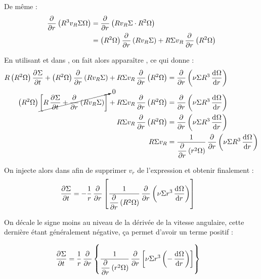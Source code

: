 De même : 
\begin{align}
\dpd{}{r}\left(R^3 v_R \Sigma \Omega\right) &= \dpd{}{r}\left(R v_R \Sigma \cdot R^2\Omega\right)\nonumber\\
&= \left(R^2\Omega\right)\dpd{}{r}\left(R v_R \Sigma\right) + R \Sigma v_R \dpd{}{r}\left(R^2\Omega\right)\label{eq:ang_mom_tmp_02}
\end{align}

En utilisant  et  dans , on fait alors apparaître , ce qui donne : 
\begin{align}
R\left(R^2\Omega\right)\dpd{\Sigma}{t} + \left(R^2\Omega\right)\dpd{}{r}\left(R v_R \Sigma\right) + R \Sigma v_R \dpd{}{r}\left(R^2\Omega\right) &= \dpd{}{r}\left(\nu \Sigma R^3 \dod{\Omega}{r}\right)\nonumber\\
\left(R^2\Omega\right)\cancelto{0}{\left[R\dpd{\Sigma}{t} + \dpd{}{r}\left(R v_R \Sigma\right)\right]} + R \Sigma v_R \dpd{}{r}\left(R^2\Omega\right) &= \dpd{}{r}\left(\nu \Sigma R^3 \dod{\Omega}{r}\right)\nonumber\\
R \Sigma v_R \dpd{}{r}\left(R^2\Omega\right) &= \dpd{}{r}\left(\nu \Sigma R^3 \dod{\Omega}{r}\right)\nonumber\\
R \Sigma v_R &= \inv{\dpd{}{r}\left(r^2\Omega\right)} \dpd{}{r}\left(\nu \Sigma R^3 \dod{\Omega}{r}\right)\label{eq:r_sigma_vr}
\end{align}

\bigskip

On injecte alors  dans  afin de supprimer $v_r$ de l'expression et obtenir finalement : 
\begin{align*}
\mathinner{ \dfrac{\partial{^{}}\Sigma}{\partial{{t}^{}}} } &= -\frac{1}{r}\mathinner{ \dfrac{\partial{^{}}}{\partial{{r}^{}}} }\left[\frac{1}{\mathinner{ \dfrac{\partial{^{}}}{\partial{{r}^{}}} }\left(R^2\Omega\right)} \mathinner{ \dfrac{\partial{^{}}}{\partial{{r}^{}}} }\left(\nu \Sigma r^3 \mathinner{ \dfrac{\operatorname{d \!}{^{}}\Omega}{\operatorname{d \!}{{r}^{}}} }\right)\right]
\end{align*}

On décale le signe moins au niveau de la dérivée de la vitesse angulaire, cette dernière étant généralement négative, ça permet d'avoir un terme positif :
\begin{important}
\begin{align}
\mathinner{ \dfrac{\partial{^{}}\Sigma}{\partial{{t}^{}}} } &= \frac{1}{r}\mathinner{ \dfrac{\partial{^{}}}{\partial{{r}^{}}} }\left\{\frac{1}{\mathinner{ \dfrac{\partial{^{}}}{\partial{{r}^{}}} }\left(r^2\Omega\right)} \mathinner{ \dfrac{\partial{^{}}}{\partial{{r}^{}}} }\left[\nu \Sigma r^3 \left(-\mathinner{ \dfrac{\operatorname{d \!}{^{}}\Omega}{\operatorname{d \!}{{r}^{}}} }\right)\right]\right\}
\end{align}
\end{important}

\bigskip

